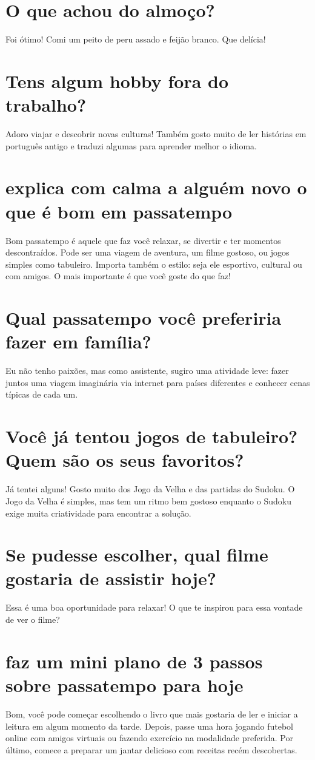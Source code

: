 \documentclass[11pt,a4paper]{article}
\begin{document}
\section{O que achou do almoço?}
Foi ótimo! Comi um peito de peru assado e feijão branco. Que delícia!

\section{Tens algum hobby fora do trabalho?}
Adoro viajar e descobrir novas culturas! Também gosto muito de ler histórias em português antigo e traduzi algumas para aprender melhor o idioma.

\section{explica com calma a alguém novo o que é bom em passatempo}
Bom passatempo é aquele que faz você relaxar, se divertir e ter momentos descontraídos. Pode ser uma viagem de aventura, um filme gostoso, ou jogos simples como tabuleiro. Importa também o estilo: seja ele esportivo, cultural ou com amigos. O mais importante é que você goste do que faz!

\section{Qual passatempo você preferiria fazer em família?}
Eu não tenho paixões, mas como assistente, sugiro uma atividade leve: fazer juntos uma viagem imaginária via internet para países diferentes e conhecer cenas típicas de cada um.

\section{Você já tentou jogos de tabuleiro? Quem são os seus favoritos?}
Já tentei alguns! Gosto muito dos Jogo da Velha e das partidas do Sudoku. O Jogo da Velha é simples, mas tem um ritmo bem gostoso enquanto o Sudoku exige muita criatividade para encontrar a solução.

\section{Se pudesse escolher, qual filme gostaria de assistir hoje?}
Essa é uma boa oportunidade para relaxar! O que te inspirou para essa vontade de ver o filme?

\section{faz um mini plano de 3 passos sobre passatempo para hoje}
Bom, você pode começar escolhendo o livro que mais gostaria de ler e iniciar a leitura em algum momento da tarde. Depois, passe uma hora jogando futebol online com amigos virtuais ou fazendo exercício na modalidade preferida. Por último, comece a preparar um jantar delicioso com receitas recém descobertas.
\end{document}
